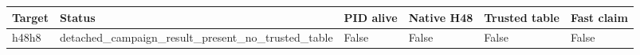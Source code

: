 {\small
\begin{tabular}{llllll}
\hline
Target & Status & PID alive & Native H48 & Trusted table & Fast claim \\
\hline
h48h8 & detached\_campaign\_result\_present\_no\_trusted\_table & False & False & False & False \\
\hline
\end{tabular}
}
